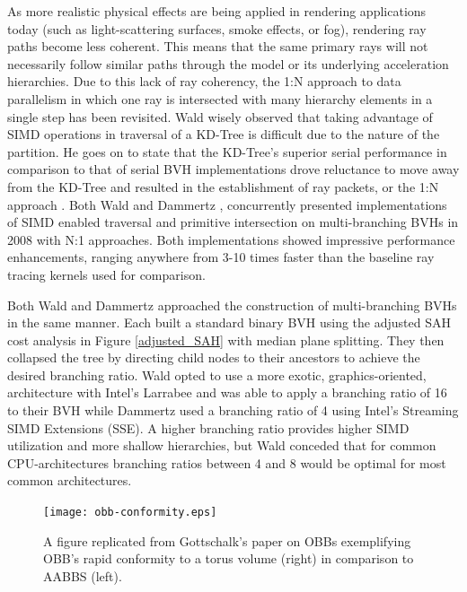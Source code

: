 As more realistic physical effects are being applied in rendering applications
today (such as light-scattering surfaces, smoke effects, or fog), rendering ray
paths become less coherent. This means that the same primary rays will not
necessarily follow similar paths through the model or its underlying
acceleration hierarchies. Due to this lack of ray coherency, the 1:N approach to
data parallelism in which one ray is intersected with many hierarchy elements in
a single step has been revisited. Wald wisely observed that taking advantage of
SIMD operations in traversal of a KD-Tree is difficult due to the nature of the
partition. He goes on to state that the KD-Tree's superior serial performance in
comparison to that of serial BVH implementations drove reluctance to move away
from the KD-Tree and resulted in the establishment of ray packets, or
the 1:N approach \cite{Wald_2008}. Both Wald and Dammertz \cite{Dammertz_2008},
concurrently presented implementations of SIMD enabled traversal and primitive
intersection on multi-branching BVHs in 2008 with N:1 approaches. Both
implementations showed impressive performance enhancements, ranging anywhere
from 3-10 times faster than the baseline ray tracing kernels used for
comparison.

Both Wald and Dammertz approached the construction of multi-branching BVHs in
the same manner. Each built a standard binary BVH using the adjusted SAH cost
analysis in Figure \ref{adjusted_SAH} with median plane splitting. They then
collapsed the tree by directing child nodes to their ancestors to achieve the
desired branching ratio. Wald opted to use a more exotic, graphics-oriented,
architecture with Intel's Larrabee and was able to apply a branching ratio of 16
to their BVH while Dammertz used a branching ratio of 4 using Intel's Streaming
SIMD Extensions (SSE). A higher branching ratio provides higher SIMD utilization
and more shallow hierarchies, but Wald conceded that for common CPU-architectures
branching ratios between 4 and 8 would be optimal for most common architectures.

\begin{figure}
  \begin{center}
    \texttt{[image: obb-conformity.eps]}
  \end{center}
  \caption[Graphic of bounding volumes surrounding a torus.]{A figure replicated
    from Gottschalk's paper on OBBs exemplifying OBB's rapid conformity to a
    torus volume (right) in comparison to AABBS (left).}
  \label{fig:obb-conformity}
\end{figure}

